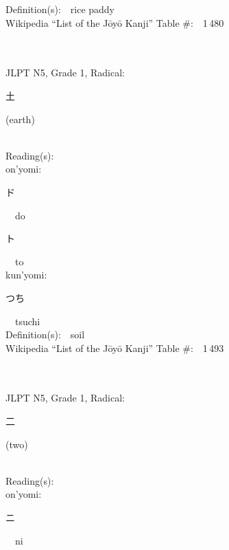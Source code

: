\begin{multicols}{2}
Definition(s):\ \ rice paddy \\
Wikipedia ``List of the J\=oy\=o Kanji'' Table \#:\ \ 1\,480 \\
\ \ \\
{\fontsize{34pt}{40pt}  }\ \ \\  %
{JLPT N5, Grade 1, Radical:\ \ {\begin{CJK}{UTF8}{min} 土 \end{CJK}} (earth) } \\
Reading(s):\ \ \\
{\hspace*{1em}}on'yomi:\ \ \\
{\hspace*{2em}}{\begin{CJK}{UTF8}{min} ド \end{CJK}}\ \ do\ \ \\
{\hspace*{2em}}{\begin{CJK}{UTF8}{min} ト \end{CJK}}\ \ to\ \ \\
{\hspace*{1em}}kun'yomi:\ \ \\
{\hspace*{2em}}{\begin{CJK}{UTF8}{min} つち \end{CJK}}\ \ tsuchi\ \ \\
Definition(s):\ \ soil \\
Wikipedia ``List of the J\=oy\=o Kanji'' Table \#:\ \ 1\,493 \\
\ \ \\
{\fontsize{34pt}{40pt}  }\ \ \\  %
{JLPT N5, Grade 1, Radical:\ \ {\begin{CJK}{UTF8}{min} 二 \end{CJK}} (two) } \\
Reading(s):\ \ \\
{\hspace*{1em}}on'yomi:\ \ \\
{\hspace*{2em}}{\begin{CJK}{UTF8}{min} ニ \end{CJK}}\ \ ni\ \ \\

\end{multicols}
